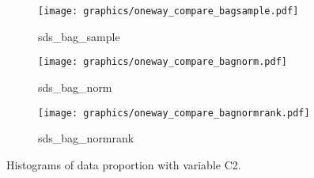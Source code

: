 \begin{figure}[H]
\begin{subfigure}{0.32\textwidth}
        \label{subfig:rfnormrankc2}
    \end{subfigure}
    \medskip
    \begin{subfigure}{0.32\textwidth}
        \centering
        \texttt{[image: graphics/oneway\_compare\_bagsample.pdf]}  
        \caption{sds\_bag\_sample}
        \label{subfig:bagsamplec2}
    \end{subfigure}
    \begin{subfigure}{0.32\textwidth}
        \centering
        \texttt{[image: graphics/oneway\_compare\_bagnorm.pdf]}  
        \caption{sds\_bag\_norm}
        \label{subfig:bagnormc2}
    \end{subfigure}
    \begin{subfigure}{0.32\textwidth}
        \centering
        \texttt{[image: graphics/oneway\_compare\_bagnormrank.pdf]}  
        \caption{sds\_bag\_normrank}
        \label{subfig:bagnormrankc2}
    \end{subfigure}
\caption{Histograms of data proportion with variable C2.}
\label{fig:c2-1}
\end{figure}

